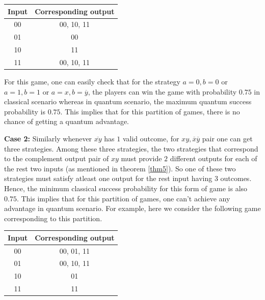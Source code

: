 \documentclass[]{svjour3}
\begin{document}
\begin{table}[htbp]
	\begin{center}
		\begin{tabular}{ |c|c| } 
			\hline
			Input & Corresponding output\\
			\hline
			\hline
			00 & 00, 10, 11\\
			\hline
			01 & 00\\
			\hline
			10 & 11\\
			\hline 
			11 & 00, 10, 11\\
			\hline
		\end{tabular}
	\end{center}
	\label{3311a}
\end{table}


For this game, one can easily check that for the strategy $a=0, b=0$ or $a=1, b=1$ or $a=x, b=\overline{y}$, the players can win the game with probability $0.75$ in classical scenario whereas in quantum scenario, the maximum quantum success probability is $0.75$. This implies that for this partition of games, there is no chance of getting a quantum advantage.


\textbf{Case 2:} Similarly whenever $\overline{xy}$ has $1$ valid outcome, for $xy,\overline{x} \overline{y}$ pair one can get three strategies. Among these three strategies, the two strategies that correspond to the complement output pair of $xy$ must provide $2$ different outputs for each of the rest two inputs (as mentioned in theorem \ref{thm5}). So one of these two strategies must satisfy atleast one output for the rest input having $3$ outcomes. Hence, the minimum classical success probability for this form of game is also $0.75$. This implies that for this partition of games, one can't achieve any advantage in quantum scenario. For example, here we consider the following game corresponding to this partition.


\begin{table}[htbp]
	\begin{center}
		\begin{tabular}{ |c|c| } 
			\hline
			Input & Corresponding output\\
			\hline
			\hline
			00 & 00, 01, 11\\
			\hline
			01 & 00, 10, 11\\
			\hline
			10 & 01\\
			\hline 
			11 & 11\\
			\hline
		\end{tabular}
	\end{center}
	\label{3311b}
\end{table}
\end{document}
